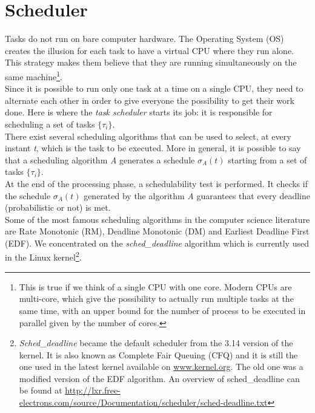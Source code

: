 \section{Scheduler}
Tasks do not run on bare computer hardware. The Operating System (OS) creates the illusion for each task to have a virtual CPU where they run alone. This strategy makes them believe that they are running simultaneously on the same machine\footnote{This is true if we think of a single CPU with one core. Modern CPUs are multi-core, which give the possibility to actually run multiple tasks at the same time, with an upper bound for the number of process to be executed in parallel given by the number of cores.}.\\
Since it is possible to run only one task at a time on a single CPU, they need to alternate each other in order to give everyone the possibility to get their work done. Here is where the \emph{task scheduler} starts its job: it is responsible for scheduling a set of tasks \( \{\tau_{i}\} \).\\
There exist several scheduling algorithms that can be used to select, at every instant \emph{t}, which is the task to be executed. More in general, it is possible to say that a scheduling algorithm \emph{A} generates a schedule \( \sigma_{A}\left(t\right) \) starting from a set of tasks \( \{\tau_{i}\} \).\\
At the end of the processing phase, a schedulability test is performed. It checks if the schedule \( \sigma_{A}\left(t\right) \) generated by the algorithm \emph{A} guarantees that every deadline (probabilistic or not) is met.\\
Some of the most famous scheduling algorithms in the computer science literature are Rate Monotonic (RM), Deadline Monotonic (DM) and Earliest Deadline First (EDF). We concentrated on the \emph{sched\_deadline} algorithm which is currently used in the Linux kernel\footnote{\emph{Sched\_deadline} became the default scheduler from the 3.14 version of the kernel. It is also known as Complete Fair Queuing (CFQ) and it is still the one used in the latest kernel available on \url{www.kernel.org}. The old one was a modified version of the EDF algorithm. An overview of sched\_deadline can be found at \url{http://lxr.free-electrons.com/source/Documentation/scheduler/sched-deadline.txt}}.

